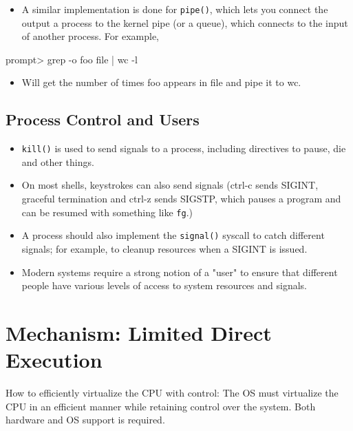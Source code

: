 \documentclass[11pt, a4paper]{article}
\theoremstyle{definition}
\theoremstyle{remark}
\newcommand{\chap}[2]{%
  \renewcommand{\thesection}{\arabic{section}}%
  \renewcommand{\theHsection}{chap.\arabic{section}}%
  \setcounter{section}{#1}\addtocounter{section}{-1}%
  \section{#2}}
\begin{document}
\begin{itemize}
  \item A similar implementation is done for \texttt{pipe()}, which lets you connect the output a process to the kernel pipe (or a queue), which connects to the input of another process. For example,
\end{itemize}
\begin{bashcode}
prompt> grep -o foo file | wc -l
\end{bashcode}
\begin{itemize}
  \item Will get the number of times foo appears in file and pipe it to wc.
\end{itemize}
\subsection{Process Control and Users}
\begin{itemize}
  \item \texttt{kill()} is used to send signals to a process, including directives to pause, die and other things. 
  \item On most shells, keystrokes can also send signals (ctrl-c sends SIGINT, graceful termination and ctrl-z sends SIGSTP, which pauses a program and can be resumed with something like \texttt{fg}.)
  \item A process should also implement the \texttt{signal()} syscall to catch different signals; for example, to cleanup resources when a SIGINT is issued.
  \item Modern systems require a strong notion of a "user" to ensure that different people have various levels of access to system resources and signals.
\end{itemize}
  \chap{6}{Mechanism: Limited Direct Execution}
How to efficiently virtualize the CPU with control: The OS must virtualize the CPU in an efficient manner while retaining control over the system. Both hardware and OS support is required. 
\end{document}
